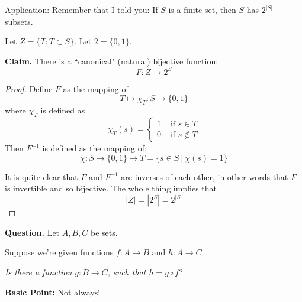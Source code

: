 \documentclass[twoside]{scrartcl}
\begin{document}
Application: Remember that I told you: If $S$ is a finite set, then $S$ has $2^{|S|}$ subsets. 

Let $Z = \{T: T \subset S\}$. Let $2 = \{0,1\}$. 

\textbf{Claim.} There is a ``canonical" (natural) bijective function: 
\[F: Z \to 2^{S}\]
\begin{proof}
Define $F$ as the mapping of
\[T \longmapsto \chi_T: S \to \{0,1\}\]
where $\chi_T$ is defined as 
\[\chi_T(s) = \begin{cases} 
 1 &\text{ if } s \in T\\
 0 &\text{ if } s \not\in T	
 \end{cases}
\]
Then $F^{-1}$ is defined as the mapping of:
\[\chi:S \to \{0,1\} \longmapsto T = \{s \in S ~|~ \chi(s) = 1\}\]

It is quite clear that $F$ and $F^{-1}$ are inverses of each other, in other words that $F$ is invertible and so bijective. The whole thing implies that 
\[|Z| = |2^S| = 2^{|S|}\]	
\end{proof}\vspace*{5pt}


\textbf{Question.} Let $A,B,C$ be sets.

 Suppose we're given functions $f: A \to B$ and $h: A \to C$: 

\begin{center}
\end{center}
\emph{Is there a function $g: B \to C$, such that $h = g \circ f$}?

\begin{center}
\end{center}


\textbf{Basic Point:} Not always!\\
\end{document}
